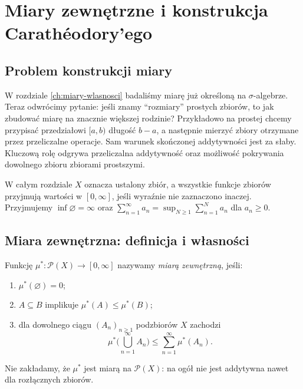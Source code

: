 \chapter{Miary zewnętrzne i konstrukcja Carathéodory'ego}
\label{ch:caratheodory}

\section{Problem konstrukcji miary}

W rozdziale \ref{ch:miary-wlasnosci} badaliśmy miarę już określoną na
$\sigma$-algebrze. Teraz odwrócimy pytanie: jeśli znamy ``rozmiary''
prostych zbiorów, to jak zbudować miarę na znacznie większej rodzinie?
Przykładowo na prostej chcemy przypisać przedziałowi $[a,b)$ długość
$b-a$, a następnie mierzyć zbiory otrzymane przez przeliczalne operacje.
Sam warunek skończonej addytywności jest za słaby. Kluczową rolę odgrywa
przeliczalna addytywność oraz możliwość pokrywania dowolnego zbioru
zbiorami prostszymi.

W całym rozdziale $X$ oznacza ustalony zbiór, a wszystkie funkcje
zbiorów przyjmują wartości w $[0,\infty]$, jeśli wyraźnie nie
zaznaczono inaczej. Przyjmujemy $\inf\varnothing=\infty$ oraz
$\sum_{n=1}^\infty a_n=\sup_{N\ge1}\sum_{n=1}^N a_n$ dla $a_n\ge0$.

\section{Miara zewnętrzna: definicja i własności}

\begin{definicja}
\label{def:outer-measure}
Funkcję $\mu^*:\mathcal P(X)\to[0,\infty]$ nazywamy
\emph{miarą zewnętrzną}, jeśli:
\begin{enumerate}[label=\textup{(\roman*)}]
\item $\mu^*(\varnothing)=0$;
\item $A\subseteq B$ implikuje $\mu^*(A)\le\mu^*(B)$;
\item dla dowolnego ciągu $(A_n)_{n\ge1}$ podzbiorów $X$ zachodzi
\begin{equation}\label{eq:outer-subadd}
\mu^*\Big(\bigcup_{n=1}^\infty A_n\Big)
\le\sum_{n=1}^\infty\mu^*(A_n).
\end{equation}
\end{enumerate}
Nie zakładamy, że $\mu^*$ jest miarą na $\mathcal P(X)$:
na ogół nie jest addytywna nawet dla rozłącznych zbiorów.
\end{definicja}

